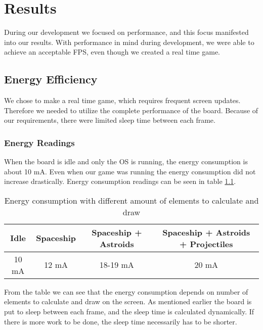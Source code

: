 \chapter{Results}
During our development we focused on performance, and this focus manifested into our results. With performance in mind during development, we were able to achieve an acceptable FPS, even though we created a real time game.

\section{Energy Efficiency}
We chose to make a real time game, which requires frequent screen updates. Therefore we needed to utilize the complete performance of the board. Because of our requirements, there were limited sleep time between each frame.

\subsection{Energy Readings}
When the board is idle and only the OS is running, the energy consumption is about 10 mA. Even when our game was running the energy consumption did not increase drastically. Energy consumption readings can be seen in table \ref{tab:energy-with-game}.

\begin{table}[H]
	\begin{center}
	\begin{tabular}{ |c|c|c|c| }
	  \hline
	  Idle & Spaceship & Spaceship + Astroids & Spaceship + Astroids + Projectiles \\
	  \hline
	  10 mA & 12 mA & 18-19 mA & 20 mA \\
	  \hline

	\end{tabular}
	\caption{Energy consumption with different amount of elements to calculate and draw}
	\label{tab:energy-with-game}
	\end{center}
\end{table}

From the table we can see that the energy consumption depends on number of elements to calculate and draw on the screen. As mentioned earlier the board is put to sleep between each frame, and the sleep time is calculated dynamically. If there is more work to be done, the sleep time necessarily has to be shorter.


